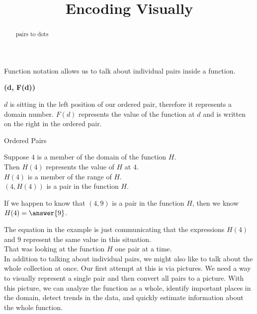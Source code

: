 \documentclass{ximera}
\title{Encoding Visually}
\begin{document}
\begin{abstract}
pairs to dots
\end{abstract}
\maketitle


Function notation allows us to talk about individual pairs inside a function.


\begin{center}
\textbf{\textcolor{purple!85!blue}{(d, F(d))}}
\end{center}




$d$ is sitting in the left position of our ordered pair, therefore it represents a domain number. $F(d)$ represents the value of the function at $d$ and is written on the right in the ordered pair.


\begin{example} Ordered Pairs

Suppose $4$ is a member of the domain of the function $H$. \\
Then $H(4)$ represents the value of $H$ at $4$. \\
$H(4)$ is a member of the range of $H$. \\
$(4, H(4))$ is a pair in the function $H$.

If we happen to know that $(4, 9)$ is a pair in the function $H$, then we know $H(4) = \answer{9}$.

\end{example}
The equation in the example is just communicating that the expressions $H(4)$ and $9$ represent the same value in this situation. \\

That was looking at the function $H$ one pair at a time. \\



In addition to talking about individual pairs, we might also like to talk about the whole collection at once.  Our first attempt at this is via pictures. We need a way to visually represent a single pair and then convert all pairs to a picture.  With this picture, we can analyze the function as a whole, identify important places in the domain, detect trends in the data, and quickly estimate information about the whole function.
\end{document}
